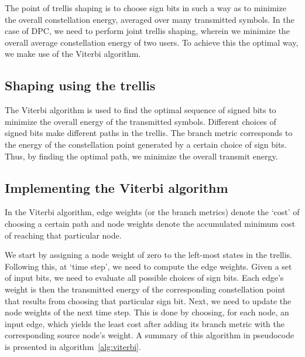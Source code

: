 The point of trellis shaping is to choose sign bits in such a way as to
minimize the overall constellation energy, averaged over many transmitted
symbols. In the case of DPC, we need to perform joint trellis shaping, wherein
we minimize the overall average constellation energy of two users. To achieve
this the optimal way, we make use of the Viterbi algorithm.

\subsection{Shaping using the trellis}

The Viterbi algorithm is used to find the optimal sequence of signed bits to
minimize the overall energy of the transmitted symbols. Different choices of
signed bits make different paths in the trellis. The branch metric corresponds
to the energy of the constellation point generated by a certain choice of sign
bits. Thus, by finding the optimal path, we minimize the overall transmit
energy.

\subsection{Implementing the Viterbi algorithm}

In the Viterbi algorithm, edge weights (or the branch metrics) denote the
`cost' of choosing a certain path and node weights denote the accumulated
minimum cost of reaching that particular node.

We start by assigning a node weight of zero to the left-most states in the
trellis. Following this, at `time step', we need to compute the edge weights.
Given a set of input bits, we need to evaluate all possible choices of sign
bits. Each edge's weight is then the transmitted energy of the corresponding
constellation point that results from choosing that particular sign bit. Next,
we need to update the node weights of the next time step. This is done by
choosing, for each node, an input edge, which yields the least cost after
adding its branch metric with the corresponding source node's weight. A summary
of this algorithm in pseudocode is presented in algorithm~\ref{alg:viterbi}.

